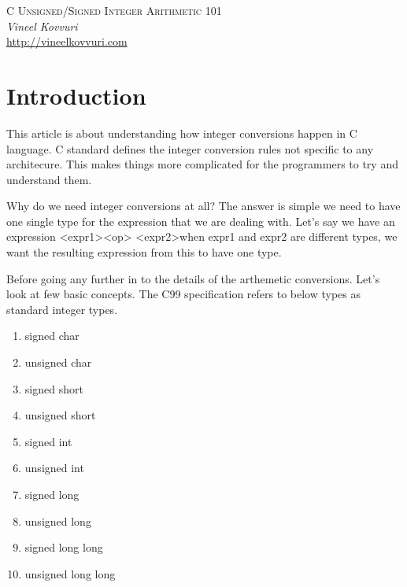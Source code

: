 \documentclass{article}
\begin{document}
\begin{titlepage}
   \begin{center}
      \Large\textsc{C Unsigned/Signed Integer Arithmetic 101}\\
      \vspace{5mm}
      \Large\textit{Vineel Kovvuri}\\
      \url{http://vineelkovvuri.com}\\
   \end{center}
\end{titlepage}

\tableofcontents

\newpage
\section{Introduction}
This article is about understanding how integer conversions happen in C
language. C standard defines the integer conversion rules not specific to any
architecure. This makes things more complicated for the programmers to try and
understand them.

Why do we need integer conversions at all? The answer is simple we need to have
one single type for the expression that we are dealing with. Let's say we have
an expression \textless expr1\textgreater \textless op\textgreater
\textless expr2\textgreater  when expr1 and expr2 are different types, we
want the resulting expression from this to have one type.

Before going any further in to the details of the arthemetic conversions. Let's
look at few basic concepts. The C99 specification refers to below types as
standard integer types.

\begin{enumerate}[noitemsep]
    \item signed char
    \item unsigned char
    \item signed short
    \item unsigned short
    \item signed int
    \item unsigned int
    \item signed long
    \item unsigned long
    \item signed long long
    \item unsigned long long
\end{enumerate}
\end{document}
